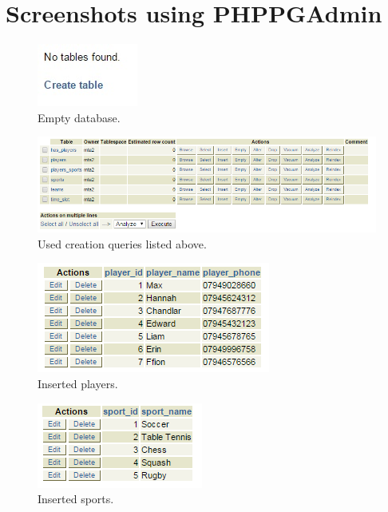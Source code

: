 \documentclass[11pt, article]{article}
\begin{document}
\section{Screenshots using PHPPGAdmin}

\begin{figure}[ht!]
\includegraphics[center]{NoTables.jpg}
\caption{Empty database.}
\end{figure}

\begin{figure}[ht!]
\includegraphics[center]{CreatedTables.png}
 \caption{Used creation queries listed above.}
\end{figure}

\begin{figure}[ht!]
\includegraphics[center]{PlayersTable.png}
 \caption{Inserted players.}
\end{figure}

\begin{figure}[ht!]
\includegraphics[center]{SportsTable.png}
 \caption{Inserted sports.}
\end{figure}
\end{document}
